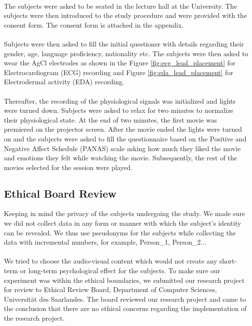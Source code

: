 \paragraph{}
The subjects were asked to be seated in the lecture hall at the University. The subjects were then introduced to the study procedure and were provided with the consent form. The consent form is attached in the appendix.
\paragraph{}
Subjects were then asked to fill the initial questioner with details regarding their gender, age, language proficiency, nationality etc. The subjects were then asked to wear the AgCl electrodes as shown in the Figure \ref{fig:ecg_lead_placement} for Electrocardiogram (ECG) recording and Figure \ref{fig:eda_lead_placement} for Electrodermal activity (EDA) recording.
\paragraph{}
Thereafter, the recording of the physiological signals was initialized and lights were turned down. Subjects were asked to relax for two minutes to normalize their physiological state. At the end of two minutes, the first movie was premiered on the projector screen. After the movie ended the lights were turned on and the subjects were asked to fill the questionnaire based on the Positive and Negative Affect Schedule (PANAS) scale \cite{panas_crocker:1997} asking how much they liked the movie and emotions they felt while watching the movie. Subsequently, the rest of the movies selected for the session were played.

\subsection{Ethical Board Review}
Keeping in mind the privacy of the subjects undergoing the study. We made sure we did not collect data in any form or manner with which the subject’s identity can be revealed. We thus use pseudonyms for the subjects while collecting the data with incremental numbers, for example, Person\_1, Person\_2...
\paragraph{}
We tried to choose the audio-visual content which would not create any short-term or long-term psychological effect for the subjects. To make sure our experiment was within the ethical boundaries, we submitted our research project for review to Ethical Review Board, Department of Computer Sciences, Universit{\"a}t des Saarlandes. The board reviewed our research project and came to the conclusion that there are no ethical concerns regarding the implementation of the research project.
